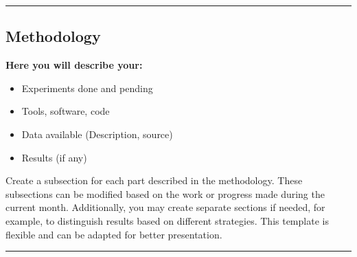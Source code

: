 {\color{gray}\hrule}
\begin{center}
\section{Methodology}
\textbf{Here you will describe your:}
\begin{itemize}
    \item Experiments done and pending
    \item Tools, software, code 
    \item Data available (Description, source)
    \item Results (if any)    
\end{itemize} 
Create a subsection for each part described in the methodology. These subsections can be modified based on the work or progress made during the current month. Additionally, you may create separate sections if needed, for example, to distinguish results based on different strategies. This template is flexible and can be adapted for better presentation.

\bigskip
\end{center}
{\color{gray}\hrule}

